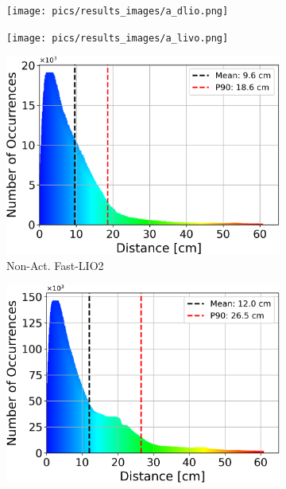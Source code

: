 \documentclass[conference]{IEEEtran}
\begin{document}
\begin{figure}
\begin{subfigure}{0.195\textwidth}
    \label{fig:results_act_lio}
\end{subfigure}
\begin{subfigure}{0.195\textwidth}
    \centering
    \texttt{[image: pics/results\_images/a\_dlio.png]}
    \label{fig:results_act_dlio}
\end{subfigure}
\begin{subfigure}{0.195\textwidth}
    \centering
    \texttt{[image: pics/results\_images/a\_livo.png]}
    \label{fig:results_act_livo}
\end{subfigure}

\begin{subfigure}{0.18\textwidth}
    \centering
    \includegraphics[width=\textwidth]{pics/histogram_results/histogram_cond_non_actuated_lio.png}
    \caption{Non-Act. Fast-LIO2}
    \label{fig:hist_non_lio}
\end{subfigure}
\hfill
\begin{subfigure}{0.18\textwidth}
    \centering
    \includegraphics[width=\textwidth]{pics/histogram_results/histogram_cond_non_actuated_livo.png}

\end{subfigure}
\end{figure}
\end{document}
